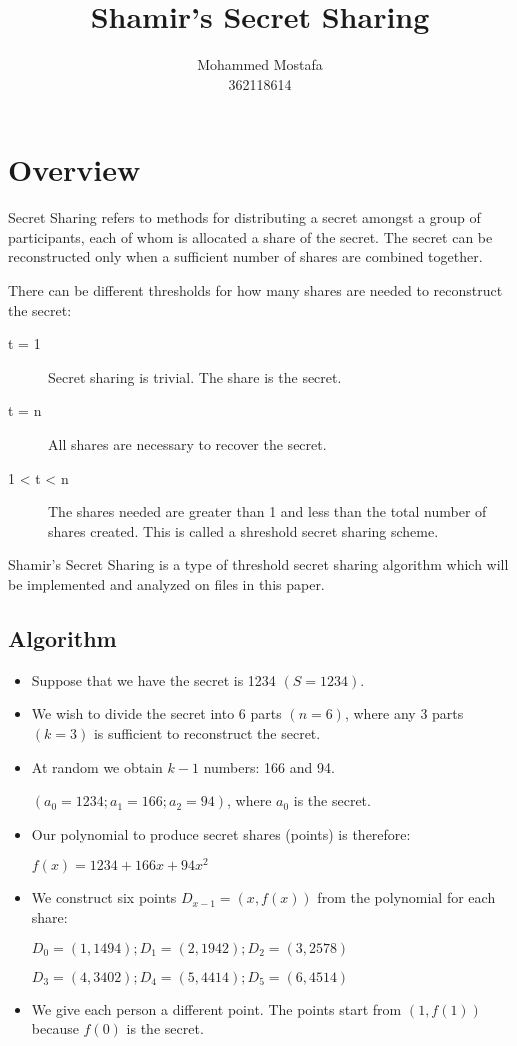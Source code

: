 \documentclass[fleqn,12pt,a4paper]{article}
\title{Shamir's Secret Sharing}
\author{Mohammed Mostafa \\
\small{362118614}}
\begin{document}
\maketitle
\vspace{15mm}
\newpage
\tableofcontents
\newpage
\section{Overview}
Secret Sharing refers to methods for distributing a secret amongst a group of participants, each of whom is allocated a share of the secret. The secret can be reconstructed only when a sufficient number of shares are combined together.

There can be  different thresholds for how many shares are needed to reconstruct the secret:
\begin{description}
    \item[t = 1] Secret sharing is trivial. The share is the secret.
    \item[t = n] All shares are necessary to recover the secret.
    \item[1 < t < n]  The shares needed are greater than 1 and less than the total number of shares created. This is called a shreshold secret sharing scheme.
\end{description}

Shamir's Secret Sharing is a type of threshold secret sharing algorithm which will be implemented and analyzed on files in this paper.

\vspace{20mm}
\subsection{Algorithm}
\begin{itemize}
    \item[] Suppose that we have the secret is 1234 $\displaystyle{(S = 1234)}$.
    \item[] We wish to divide the secret into 6 parts $\displaystyle{(n = 6)}$, where any 3 parts $\displaystyle{(k = 3)}$ is sufficient to reconstruct the secret.
    \item[] At random we obtain $\displaystyle{k - 1}$ numbers: 166 and 94. 
    
    $\displaystyle{(a_0 = 1234; a_1 = 166; a_2 = 94)}$, where $\displaystyle{a_0}$ is the secret.
    \item[] Our polynomial to produce secret shares (points) is therefore:

    $\displaystyle{f(x) = 1234 + 166x + 94x^2}$
    \item[] We construct six points $\displaystyle{D_{x-1} = (x,f(x))}$  from the polynomial for each share:

    $\displaystyle{D_0 = (1, 1494); D_1 = (2, 1942); D_2 = (3, 2578)}$

    $\displaystyle{D_3 = (4, 3402); D_4 = (5, 4414); D_5 = (6, 4514)}$

    \item[] We give each person a different point. The points start from $\displaystyle{(1, f(1))}$ because $\displaystyle{f(0)}$ is the secret. 
\end{itemize}
\end{document}

